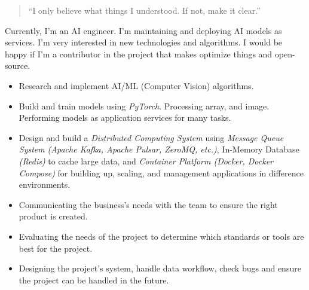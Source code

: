 \documentclass[10pt,a4paper,ragged2e,withhyper]{altacv}
\begin{document}
\begin{paracol}{2}
\bigskip

\begin{quote}
	``I only believe what things I understood. If not, make it clear.''
\end{quote}

\bigskip

\begin{minipage}{\linewidth}
\justifying
Currently, I'm an AI engineer. I'm maintaining and deploying AI models as services. I'm very interested in new technologies and algorithms. I would be happy if I'm a contributor in the project that makes optimize things and open-source.
\end{minipage}

\smallskip



\begin{minipage}{\linewidth}
\justifying
\begin{itemize}
	
	\item Research and implement AI/ML (Computer Vision) algorithms.
	\item Build and train models using \textit{PyTorch}. Processing array, and image. Performing models as application services for many tasks.
	
	\item Design and build a \textit{Distributed Computing System} using \textit{Message Queue System} \textit{(Apache Kafka, Apache Pulsar, ZeroMQ, etc.)}, In-Memory Database \textit{(Redis)} to cache large data, and \textit{Container Platform (Docker, Docker Compose)} for building up, scaling, and management applications in difference environments.
	
	\item Communicating the business's needs with the team to ensure the right product is created. 
	\item Evaluating the needs of the project to determine which standards or tools are best for the project. 
	\item Designing the project’s system, handle data workflow, check bugs and ensure the project can be handled in the future.
	

\end{itemize}
\end{minipage}
\end{paracol}
\end{document}
